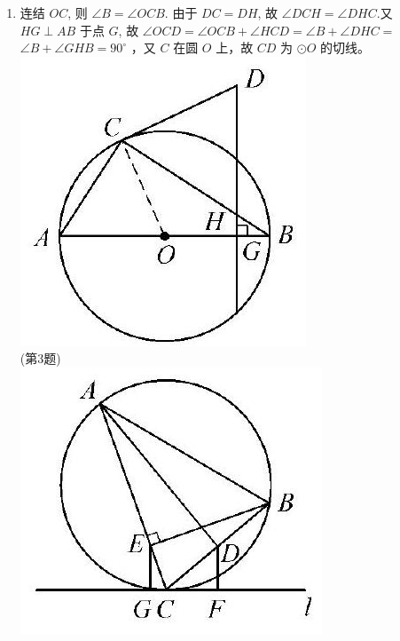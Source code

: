\documentclass[10pt]{article}
\begin{document}
\begin{enumerate}
  \item 连结 $O C$, 则 $\angle B=\angle O C B$. 由于 $D C=D H$, 故 $\angle D C H=\angle D H C$.又 $H G \perp A B$ 于点 $G$, 故 $\angle O C D=\angle O C B+\angle H C D=\angle B+\angle D H C=$ $\angle B+\angle G H B=90^{\circ}$ ，又 $C$ 在圆 $O$ 上，故 $C D$ 为 $\odot O$ 的切线。\\
\includegraphics[max width=\textwidth, center]{2024_10_30_66b8e5e701da2093c133g-093}\\
(第3题)\\
\includegraphics[max width=\textwidth, center]{2024_10_30_66b8e5e701da2093c133g-093(1)}\\

\end{enumerate}
\end{document}

